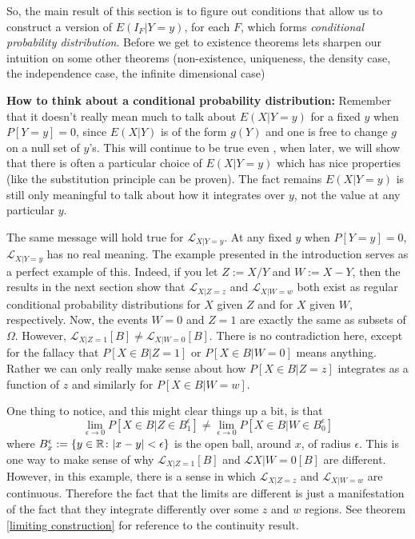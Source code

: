So, the main result of this section is to figure out conditions that allow us to construct a version of  $E(I_F|Y = y)$, for each $F$, which forms  {\it conditional probability distribution}. Before we get to existence theorems lets sharpen our intuition on some other theorems (non-existence, uniqueness, the density case, the independence case, the infinite dimensional case)

{\bf How to think about a conditional probability distribution:}
Remember that  it doesn't really mean much to talk about $E(X|Y=y)$ for a fixed $y$ when $P[Y=y]=0$, since $E(X|Y)$  is of the form  $g(Y)$ and one is free to change $g$ on a null set of $y$'s. This will continue to be true even , when later, we will show that there is often a particular choice of $E(X|Y=y)$ which has nice properties (like the substitution principle can be proven). The fact remains $E(X|Y=y)$ is still only meaningful to talk about how it integrates over $y$, not the value at any particular $y$.

The same message will hold true for $\mathcal L_{X|Y=y}$.  At any fixed $y$ when $P[Y=y]=0$, $\mathcal L_{X|Y=y}$ has no real meaning. The example presented in the introduction serves as a perfect example of this. Indeed, if you let $Z := X/Y$ and $W := X-Y $, then the results in the next section show that $\mathcal L_{X|Z=z}$ and $\mathcal L_{X|W=w}$ both exist as regular conditional probability distributions for $X$ given $Z$ and for $X$ given $W$, respectively. Now, the events $W = 0$ and $Z = 1$ are exactly the same as subsets of $\Omega$. However, $\mathcal L_{X|Z=1}[B]\neq \mathcal L_{X|W = 0}[B]$. There is no contradiction here, except for the fallacy that  $P[X\in B| Z=1  ]$ or $P[X\in B| W=0  ]$ means anything. Rather we can only really make sense about how $P[X\in B| Z=z ]$ integrates as a function of $z$ and similarly for $P[X\in B| W=w]$.

One thing to notice, and this might clear things up a bit, is that
\[
\lim_{\epsilon\rightarrow 0}P[X\in B| Z\in B_1^\epsilon ]\neq \lim_{\epsilon\rightarrow 0} P[X\in B| W\in B_0^\epsilon ]
\]
 where $B_x^\epsilon := \{y\in\Bbb R\colon |x-y|<\epsilon  \}$ is the open ball, around $x$, of radius $\epsilon$. This is one way to make sense of why $\mathcal L_{X|Z=1}[B]$ and $\mathcal L{X|W = 0}[B]$ are different. However, in this example, there is a sense in which $\mathcal L_{X|Z=z}$ and $\mathcal L_{X|W = w}$ are continuous. Therefore the fact that the limits are different is just a manifestation of the fact that they integrate differently over some $z$ and $w$ regions.  See theorem \ref{limiting construction} for reference to the continuity result.


